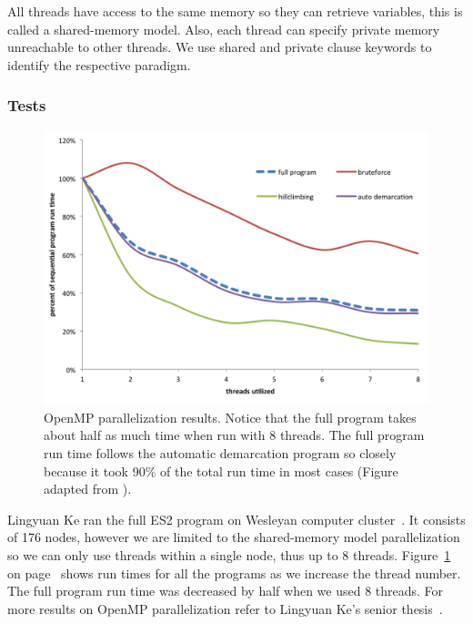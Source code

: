 All threads have access to the same memory so they can retrieve variables, this is called a shared-memory model.
Also, each thread can specify private memory unreachable to other threads.
We use shared and private clause keywords to identify the respective paradigm.

\subsubsection*{Tests}
\begin{figure}[h!]
\centering
\includegraphics[scale=0.6]{images/LingParallelized-CH4}
\caption[OpenMP parallelization results.]{OpenMP parallelization results. Notice that the full program takes about half as much time when run with 8 threads. The full program run time follows the automatic demarcation program so closely because it took 90\% of the total run time in most cases (Figure adapted from \protect\cite{lingThesis}).}
\label{fig:LingParallelized}
\end{figure}

Lingyuan Ke ran the full ES2 program on Wesleyan computer cluster~\cite{lingThesis}.
It consists of 176 nodes, however we are limited to the shared-memory model parallelization so we can only use threads within a single node, thus up to 8 threads.
Figure~\ref{fig:LingParallelized} on page~\pageref{fig:LingParallelized} shows run times for all the programs as we increase the thread number.
The full program run time was decreased by half when we used 8 threads.
For more results on OpenMP parallelization refer to Lingyuan Ke's senior thesis~\cite{lingThesis}.


